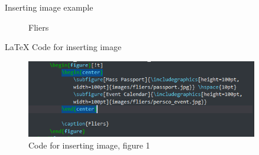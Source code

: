 \documentclass{beamer}
\begin{document}
	\begin{frame}{Inserting image example}
		\begin{figure}[!t]
			\begin{center}
				 \hspace{5pt}
			\end{center}
			
			\caption{Fliers}
		\end{figure}
	\end{frame}
	\begin{frame}{LaTeX Code for inserting image}
		\begin{figure}
			\includegraphics[width=0.9\textwidth, height=0.6\textheight]{images/code/fliers_code.png}
			
			\caption{Code for inserting image, figure 1}
		\end{figure}
	\end{frame}
	
	
	
\end{document}
